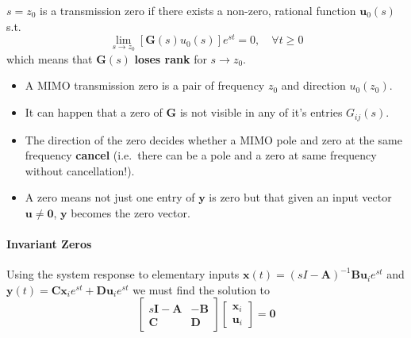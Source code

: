 $s = z_0$ is a transmission zero if there exists a non-zero, rational function $\mathbf{u}_0(s)$ s.t.
\begin{equation*}
    \lim_{s\to z_0}\left[\mathbf{G}(s)u_0(s)\right]e^{st}=0,\quad\forall t\geq0
\end{equation*}
which means that $\mathbf{\mathbf{G}}(s)$ \textbf{loses rank} for $s\rightarrow z_0$.


\begin{itemize}
    \item A MIMO transmission zero is a pair of frequency $z_0$ and direction $u_0(z_0)$.
    \item It can happen that a zero of $\mathbf{G}$ is not visible in any of it's entries $G_{ij}(s)$.
    \item The direction of the zero decides whether a MIMO pole and zero at the same frequency \textbf{cancel} (i.e.\ there can be a pole and a zero at same frequency without cancellation!).
    \item A zero means not just one entry of $\mathbf{y}$ is zero but that given an input vector $\mathbf{u} \ne \mathbf{0}$, $\mathbf{y}$ becomes the zero vector.
\end{itemize}

\paragraph{Invariant Zeros}

Using the system response to elementary inputs $\mathbf{x}(t)={(sI-\mathbf{A})}^{-1}\mathbf{Bu}_i e^{st}$ and $\mathbf{y}(t)=\mathbf{Cx}_i e^{st}+\mathbf{Du}_i e^{st}$ we must find the solution to
\begin{equation*}
    \begin{bmatrix}
        s\mathbf{I}-\mathbf{A} & -\mathbf{B} \\
        \mathbf{C}             & \mathbf{D}
    \end{bmatrix}
    \begin{bmatrix}
        \mathbf{x}_i \\
        \mathbf{u}_i
    \end{bmatrix}=\mathbf{0}
\end{equation*}



